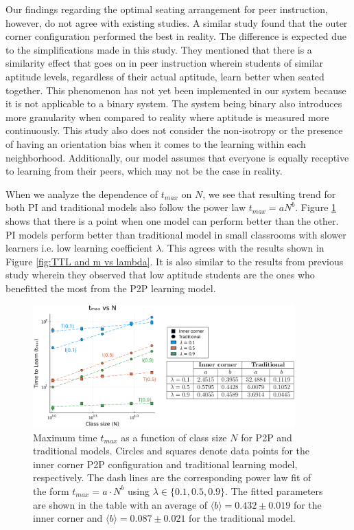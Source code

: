 \documentclass[10pt,a4paper,twoside]{article}
\begin{document}
Our findings regarding the optimal seating arrangement for peer instruction, however, do not agree with existing studies. A similar study \cite{roxas2010seating} found that the outer corner configuration performed the best in reality. The difference is expected due to the simplifications made in this study. They mentioned that there is a similarity effect that goes on in peer instruction wherein students of similar aptitude levels, regardless of their actual aptitude, learn better when seated together. This phenomenon has not yet been implemented in our system because it is not applicable to a binary system. The system being binary also introduces more granularity when compared to reality where aptitude is measured more continuously. This study also does not consider the non-isotropy or the presence of having an orientation bias when it comes to the learning within each neighborhood. Additionally, our model assumes that everyone is equally receptive to learning from their peers, which may not be the case in reality.

When we analyze the dependence of $t_{max}$ on $N$, we see that resulting trend for both PI and traditional models also follow the power law $t_{max}=aN^b$. Figure \ref{fig:tmax vs N} shows that there is a point when one model can perform better than the other. PI models perform better than traditional model in small classrooms with slower learners i.e. low learning coefficient $\lambda$. This agrees with the results shown in Figure \ref{fig:TTL and m vs lambda}. It is also similar to the results from previous study \cite{roxas2010seating} wherein they observed that low aptitude students are the ones who benefitted the most from the P2P learning model.

\begin{figure}[h]
  \centering
  \includegraphics[width=0.9\textwidth]{figures/picture3}
  \caption{Maximum time $t_{max}$ as a function of class size $N$ for P2P and traditional models. Circles and squares denote data points for the inner corner P2P configuration and traditional learning model, respectively. The dash lines are the corresponding power law fit of the form $t_{max}=a \cdot N^b$ using $\lambda \in \lbrace 0.1, 0.5, 0.9 \rbrace$. The fitted parameters are shown in the table with an average of $\langle b \rangle = 0.432 \pm 0.019$ for the inner corner and $\langle b \rangle = 0.087\pm0.021$ for the traditional model.
  }
  \label{fig:tmax vs N}
\end{figure}
\end{document}
